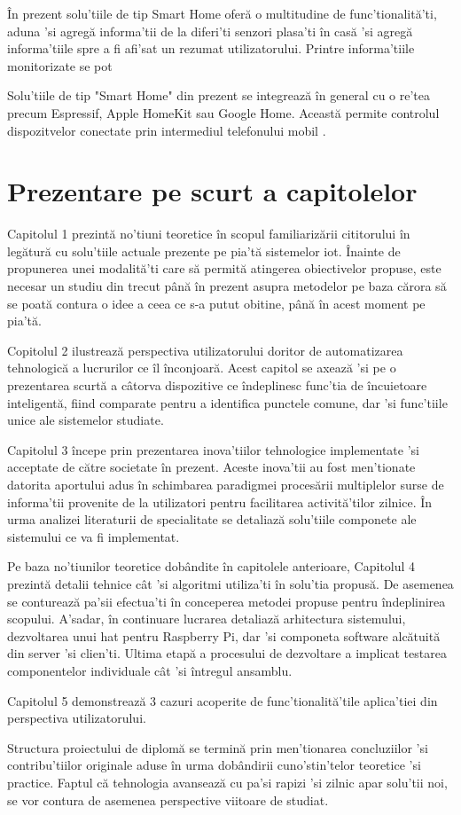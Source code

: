 În prezent solu'tiile de tip Smart Home oferă o multitudine de func'tionalită'ti, aduna 'si agregă informa'tii de la diferi'ti senzori plasa'ti în casă 'si agregă informa'tiile spre a fi afi'sat un rezumat utilizatorului. Printre informa'tiile monitorizate se pot 

Solu'tiile de tip "Smart Home" din prezent se integrează în general cu o re'tea precum Espressif, Apple HomeKit sau Google Home. Această permite controlul dispozitvelor conectate prin intermediul telefonului mobil \cite{RISTESKASTOJKOSKA20171454}.


\section {Prezentare pe scurt a capitolelor}

Capitolul 1 prezintă no'tiuni teoretice în scopul familiarizării cititorului în legătură cu solu'tiile actuale prezente pe pia'tă sistemelor \acrshort{iot}. Înainte de propunerea unei modalită'ti care să permită atingerea obiectivelor propuse, este necesar un studiu din trecut până în prezent asupra metodelor pe baza cărora să se poată contura o idee a ceea ce s-a putut obitine, până în acest moment pe pia'tă.

Copitolul 2 ilustrează perspectiva utilizatorului doritor de automatizarea tehnologică a lucrurilor ce îl înconjoară. Acest capitol se axează 'si pe o prezentarea scurtă a câtorva dispozitive ce îndeplinesc func'tia de încuietoare inteligentă, fiind comparate pentru a identifica punctele comune, dar 'si func'tiile unice ale sistemelor studiate.

Capitolul 3 începe prin prezentarea inova'tiilor tehnologice implementate 'si acceptate de către societate în prezent. Aceste inova'tii au fost men'tionate datorita aportului adus în schimbarea paradigmei procesării multiplelor surse de informa'tii provenite de la utilizatori pentru facilitarea activită'tilor zilnice. În urma analizei literaturii de specialitate se detaliază solu'tiile componete ale sistemului ce va fi implementat.

Pe baza no'tiunilor teoretice dobândite în capitolele anterioare, Capitolul 4 prezintă detalii tehnice cât 'si algoritmi utiliza'ti în solu'tia propusă. De asemenea se conturează pa'sii efectua'ti în conceperea metodei propuse pentru îndeplinirea scopului. A'sadar, în continuare lucrarea detaliază arhitectura sistemului, dezvoltarea unui \acrshort{hat} pentru Raspberry Pi, dar 'si componeta software alcătuită din server 'si clien'ti. Ultima etapă a procesului de dezvoltare a implicat testarea componentelor individuale cât 'si întregul ansamblu.

Capitolul 5 demonstrează 3 cazuri acoperite de func'tionalită'tile aplica'tiei din perspectiva utilizatorului.

Structura proiectului de diplomă se termină prin men'tionarea concluziilor 'si contribu'tiilor originale aduse în urma dobândirii cuno'stin'telor teoretice 'si practice. Faptul că tehnologia avansează cu pa'si rapizi 'si zilnic apar solu'tii noi, se vor contura de asemenea perspective viitoare de studiat.